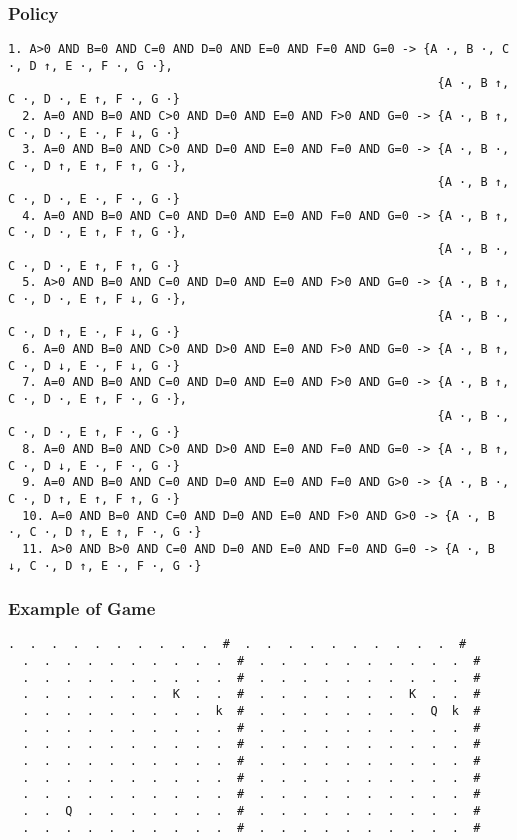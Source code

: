 \documentclass[a4paper]{article}
\begin{document}
\subsubsection{Policy}
\begin{Verbatim}[fontsize=\footnotesize]
  1. A>0 AND B=0 AND C=0 AND D=0 AND E=0 AND F=0 AND G=0 -> {A ·, B ·, C ·, D ↑, E ·, F ·, G ·},
                                                            {A ·, B ↑, C ·, D ·, E ↑, F ·, G ·}
  2. A=0 AND B=0 AND C>0 AND D=0 AND E=0 AND F>0 AND G=0 -> {A ·, B ↑, C ·, D ·, E ·, F ↓, G ·}
  3. A=0 AND B=0 AND C>0 AND D=0 AND E=0 AND F=0 AND G=0 -> {A ·, B ·, C ·, D ↑, E ↑, F ↑, G ·},
                                                            {A ·, B ↑, C ·, D ·, E ·, F ·, G ·}
  4. A=0 AND B=0 AND C=0 AND D=0 AND E=0 AND F=0 AND G=0 -> {A ·, B ↑, C ·, D ·, E ↑, F ↑, G ·},
                                                            {A ·, B ·, C ·, D ·, E ↑, F ↑, G ·}
  5. A>0 AND B=0 AND C=0 AND D=0 AND E=0 AND F>0 AND G=0 -> {A ·, B ↑, C ·, D ·, E ↑, F ↓, G ·},
                                                            {A ·, B ·, C ·, D ↑, E ·, F ↓, G ·}
  6. A=0 AND B=0 AND C>0 AND D>0 AND E=0 AND F>0 AND G=0 -> {A ·, B ↑, C ·, D ↓, E ·, F ↓, G ·}
  7. A=0 AND B=0 AND C=0 AND D=0 AND E=0 AND F>0 AND G=0 -> {A ·, B ↑, C ·, D ·, E ↑, F ·, G ·},
                                                            {A ·, B ·, C ·, D ·, E ↑, F ·, G ·}
  8. A=0 AND B=0 AND C>0 AND D>0 AND E=0 AND F=0 AND G=0 -> {A ·, B ↑, C ·, D ↓, E ·, F ·, G ·}
  9. A=0 AND B=0 AND C=0 AND D=0 AND E=0 AND F=0 AND G>0 -> {A ·, B ·, C ·, D ↑, E ↑, F ↑, G ·}
  10. A=0 AND B=0 AND C=0 AND D=0 AND E=0 AND F>0 AND G>0 -> {A ·, B ·, C ·, D ↑, E ↑, F ·, G ·}
  11. A>0 AND B>0 AND C=0 AND D=0 AND E=0 AND F=0 AND G=0 -> {A ·, B ↓, C ·, D ↑, E ·, F ·, G ·}
\end{Verbatim}

\subsubsection{Example of Game}
\begin{Verbatim}[fontsize=\footnotesize]
  .  .  .  .  .  .  .  .  .  .  #  .  .  .  .  .  .  .  .  .  .  #
  .  .  .  .  .  .  .  .  .  .  #  .  .  .  .  .  .  .  .  .  .  #
  .  .  .  .  .  .  .  .  .  .  #  .  .  .  .  .  .  .  .  .  .  #
  .  .  .  .  .  .  .  K  .  .  #  .  .  .  .  .  .  .  K  .  .  #
  .  .  .  .  .  .  .  .  .  k  #  .  .  .  .  .  .  .  .  Q  k  #
  .  .  .  .  .  .  .  .  .  .  #  .  .  .  .  .  .  .  .  .  .  #
  .  .  .  .  .  .  .  .  .  .  #  .  .  .  .  .  .  .  .  .  .  #
  .  .  .  .  .  .  .  .  .  .  #  .  .  .  .  .  .  .  .  .  .  #
  .  .  .  .  .  .  .  .  .  .  #  .  .  .  .  .  .  .  .  .  .  #
  .  .  .  .  .  .  .  .  .  .  #  .  .  .  .  .  .  .  .  .  .  #
  .  .  Q  .  .  .  .  .  .  .  #  .  .  .  .  .  .  .  .  .  .  #
  .  .  .  .  .  .  .  .  .  .  #  .  .  .  .  .  .  .  .  .  .  #
\end{Verbatim}
\end{document}
